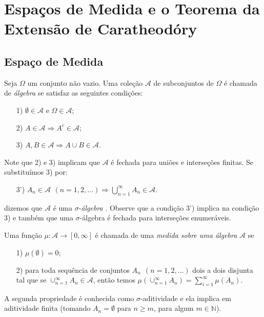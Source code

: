\chapter[Aula 2]{Espaços de Medida e o Teorema da Extensão de Caratheodóry}
\chaptermark{}
\section{Espaço de Medida}


Seja $\Omega$ um conjunto não vazio.
Uma coleção $\mathcal{A}$ de subconjuntos de $\Omega$ é chamada de
 {\it álgebra} se satisfaz as seguintes condições:
\begin{itemize}
	\item[1)] $\emptyset\in\mathcal{A}$ e $\Omega\in\mathcal{A}$;
	\item[2)] $A\in \mathcal{A} \Rightarrow A^c\in\mathcal{A}$;
	\item[3)] $A,B\in \mathcal{A} \Rightarrow A\cup B\in\mathcal{A}$.
\end{itemize}
Note que 2) e 3) implicam que $\mathcal{A}$ é fechada para uniões 
e interseções finitas. Se substituímos 3) por:
\begin{itemize}
	\item[3')] $A_n\in\mathcal{A}\ \, (n=1,2,\ldots) 
				\Rightarrow 
				\displaystyle\bigcup_{n=1}^{\infty} A_n \in \mathcal{A}$.
\end{itemize}
dizemos que $\mathcal{A}$ é uma $\sigma$-{\it álgebra}  . Observe que a condição 3') 
implica na condição 3) e também que uma $\sigma$-álgebra é fechada para
interseções enumeráveis.

\begin{definicao}[Medida]
Uma função $\mu:\mathcal{A}\to [0,\infty]$ é chamada de uma {\it medida sobre uma álgebra} 
$\mathcal{A}$ se 
\begin{itemize}
	\item[1)] $\mu(\emptyset)=0$;
	\item[2)] para toda sequência de conjuntos $A_n \ \ (n=1,2,\ldots)$ dois a dois disjunta
				tal que se $\cup_{n=1}^{\infty}A_n \in \mathcal{A}$, então temos
			 $\mu(\cup_{n=1}^{\infty} A_n ) =\sum_{i=1}^{\infty}\mu(A_n)$.
\end{itemize}
\end{definicao}
A segunda propriedade é conhecida como $\sigma$-aditividade e ela implica 
em aditividade finita (tomando $A_n=\emptyset$ para $n\geq m$, para algum $m\in\mathbb{N}$).


